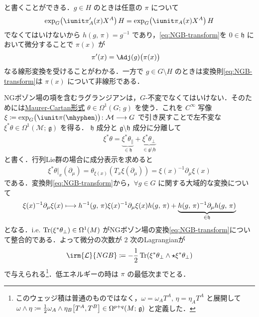 \documentclass[TQFT_main]{subfiles}
\begin{document}
と書くことができる．$g \in H$ のときは任意の $\pi$ について
\begin{align}
    \exp_G \bigl( \iunit \pi'_A(x) X^A \bigr)\, H = \exp_G\bigl(\iunit \pi_A(x)X^A\bigr)\, H
\end{align}
でなくてはいけないから $h(g,\, \pi) = g^{-1}$ であり，\eqref{eq:NGB-transform}を $0 \in \mathfrak{h}$ において微分することで $\pi(x)$ が
\begin{align}
    \pi'(x)
    &= \Adj(g)\bigl(\pi(x)\bigr)
\end{align}
なる線形変換を受けることがわかる．一方で $g \in G \setminus H$ のときは変換則\eqref{eq:NGB-transform}は $\pi(x)$ について非線形である．

NGボゾン場の項を含むラグランジアンは，$G$-不変でなくてはいけない．そのためには\hyperref[def:Maurer-Cartan]{Maurer-Cartan形式} $\theta \in \Omega^1(G;\, g)$ を使う．これを $C^\infty$ 写像 $\xi \coloneqq \exp_G \bigl( \iunit \pi(\mhyphen) \bigr) \colon \mathcal{M} \lto G$ で引き戻すことで左不変な $\xi^* \theta \in \Omega^1(\mathcal{M};\, \mathfrak{g})$ を得る．
$\mathfrak{h}$ 成分と $\mathfrak{g} \setminus \mathfrak{h}$ 成分に分離して
\begin{align}
    \xi^* \theta = \underbrace{\xi^* \theta_{\parallel}}_{\in\mathfrak{h}} + \underbrace{\xi^* \theta_{\perp}}_{\in \mathfrak{g} \setminus \mathfrak{h}}
\end{align}
と書く．行列Lie群の場合に成分表示を求めると
\begin{align}
    \xi^*\theta|_x (\partial_\mu) = \theta_{\xi(x)} \left( T_x \xi (\partial_\mu) \right) = \xi(x)^{-1} \partial_\mu \xi(x)
\end{align}
である．変換則\eqref{eq:NGB-transform}から，$\forall g \in G$ に関する大域的な変換について
\begin{align}
    \xi(x)^{-1} \partial_\mu \xi(x) \longmapsto h^{-1}(g,\, \pi) \xi(x)^{-1} \partial_\mu \xi(x) h(g,\, \pi) +  \underbrace{h(g,\, \pi)^{-1} \partial_\mu h(g,\, \pi)}_{\in \mathfrak{h}}
\end{align}
となる．i.e. $\Tr(\xi^* \theta_{\perp}) \in \Omega^1(M)$ がNGボゾン場の変換\eqref{eq:NGB-transform}について整合的である．よって微分の次数が $2$ 次のLagrangianが
\begin{align}
    \irm{\mathcal{L}}{NGB} \coloneqq - \frac{1}{2}\Tr(\xi^* \theta_{\perp}\wedge \star \xi^* \theta_{\perp}) 
\end{align}
で与えられる\footnote{このウェッジ積は普通のものではなく，$\omega = \omega_A T^A,\, \eta = \eta_A T^A$ と展開して $\omega \wedge \eta \coloneqq \frac{1}{2} \omega_A \wedge \eta_B \comm{T^A}{T^B} \in \Omega^{p+q}(M;\, \mathfrak{g})$ と定義した．}．低エネルギーの時は $\pi$ の最低次までとる．
\end{document}
